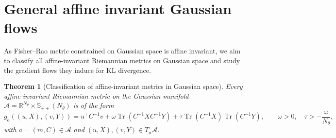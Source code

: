 \documentclass[11pt]{article}
\theoremstyle{plain}
\newtheorem{theorem}{Theorem}[section]
\theoremstyle{definition}
\theoremstyle{remark}
\newcommand{\R}{\mathbb{R}}
\newcommand{\Tr}{\operatorname{Tr}}
\newcommand{\SPD}{\mathbb{S}_{++}}
\newcommand{\Aspace}{\mathcal{A}}
\begin{document}
\section{General affine invariant Gaussian flows}

As Fisher--Rao metric constrained on Gaussian space is affine invariant, we aim to classify all affine-invariant Riemannian metrics on Gaussian space and study the gradient flows they induce for KL divergence.

\begin{theorem}[Classification of affine-invariant metrics in Gaussian space]\label{thm:affine-invariant-metrics}
    Every affine-invariant Riemannian metric on the Gaussian manifold $\Aspace = \R^{N_\theta} \times \SPD (N_\theta)$ is of the form
    \begin{equation*}
        g_{a} ((u, X), (v, Y)) = u^\top C^{-1} v + \omega \Tr(C^{-1} X C^{-1} Y) + \tau \Tr(C^{-1} X ) \Tr(C^{-1} Y), \qquad \omega > 0,\quad \tau > - \frac{\omega}{N_\theta},
    \end{equation*}
    with $a = (m, C) \in \Aspace$ and $(u, X), (v, Y) \in T_a \Aspace$.
\end{theorem}
\end{document}
